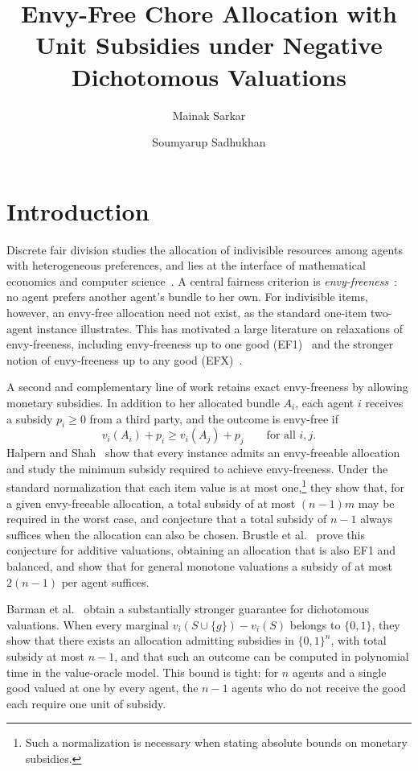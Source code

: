 \documentclass[sigconf,anonymous]{aamas}
\title{Envy-Free Chore Allocation with Unit Subsidies under Negative Dichotomous Valuations}
\author{Mainak Sarkar}
\affiliation{
  \institution{Indian Institute of Technology, Kanpur}
  \city{Kanpur}
  \country{India}}
\author{Soumyarup Sadhukhan}
\affiliation{
  \institution{Indian Institute of Technology, Kanpur}
  \city{Kanpur}
  \country{India}}
\theoremstyle{acmplain}
\theoremstyle{acmdefinition}
\theoremstyle{acmplain}
\begin{document}
\maketitle

\section{Introduction}
\label{sec:intro}
Discrete fair division studies the allocation of indivisible resources among agents with heterogeneous preferences, and lies at the interface of mathematical economics and computer science~\cite{BCE16,End17}. A central fairness criterion is \emph{envy-freeness}~\cite{Fol67,Var74}: no agent prefers another agent's bundle to her own. For indivisible items, however, an envy-free allocation need not exist, as the standard one-item two-agent instance illustrates. This has motivated a large literature on relaxations of envy-freeness, including envy-freeness up to one good (EF1)~\cite{Bud11,LMMS04} and the stronger notion of envy-freeness up to any good (EFX)~\cite{CKMPSW19}.

A second and complementary line of work retains exact envy-freeness by allowing monetary subsidies. In addition to her allocated bundle $A_i$, each agent $i$ receives a subsidy $p_i\geq 0$ from a third party, and the outcome is envy-free if
\[v_i(A_i)+p_i \geq v_i(A_j)+p_j
    \qquad\text{for all }i,j.\]
Halpern and Shah~\cite{HS19} show that every instance admits an envy-freeable allocation and study the minimum subsidy required to achieve envy-freeness. Under the standard normalization that each item value is at most one,\footnote{Such a normalization is necessary when stating absolute bounds on monetary subsidies.} they show that, for a given envy-freeable allocation, a total subsidy of at most $(n-1)m$ may be required in the worst case, and conjecture that a total subsidy of $n-1$ always suffices when the allocation can also be chosen. Brustle et al.~\cite{BDNSV20} prove this conjecture for additive valuations, obtaining an allocation that is also EF1 and balanced, and show that for general monotone valuations a subsidy of at most $2(n-1)$ per agent suffices.

Barman et al.~\cite{BKNS22} obtain a substantially stronger guarantee for dichotomous valuations. When every marginal $v_i(S\cup\{g\})-v_i(S)$ belongs to $\{0,1\}$, they show that there exists an allocation admitting subsidies in $\{0,1\}^n$, with total subsidy at most $n-1$, and that such an outcome can be computed in polynomial time in the value-oracle model. This bound is tight: for $n$ agents and a single good valued at one by every agent, the $n-1$ agents who do not receive the good each require one unit of subsidy.
\end{document}
